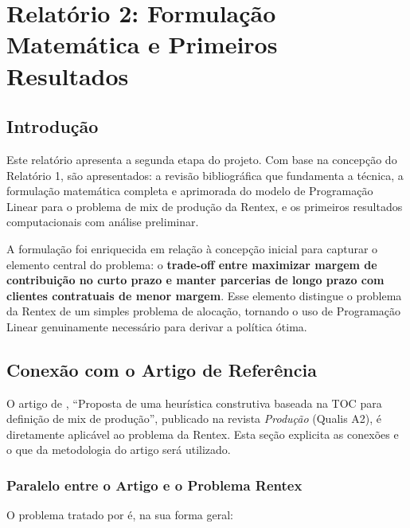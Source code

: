 
\section{Relatório 2: Formulação Matemática e Primeiros Resultados}

\subsection{Introdução}

Este relatório apresenta a segunda etapa do projeto. Com base na concepção
do Relatório 1, são apresentados: a revisão bibliográfica que fundamenta a
técnica, a formulação matemática completa e aprimorada do modelo de
Programação Linear para o problema de mix de produção da Rentex, e os
primeiros resultados computacionais com análise preliminar.

A formulação foi enriquecida em relação à concepção inicial para capturar o
elemento central do problema: o \textbf{trade-off entre maximizar margem de
contribuição no curto prazo e manter parcerias de longo prazo com clientes
contratuais de menor margem}. Esse elemento distingue o problema da Rentex de
um simples problema de alocação, tornando o uso de Programação Linear
genuinamente necessário para derivar a política ótima.

\newpage

\subsection{Conexão com o Artigo de Referência}

O artigo de \textcite{sobreiro2013}, ``Proposta de uma heurística construtiva
baseada na TOC para definição de mix de produção'', publicado na revista
\textit{Produção} (Qualis A2), é diretamente aplicável ao problema da Rentex.
Esta seção explicita as conexões e o que da metodologia do artigo será utilizado.

\subsubsection{Paralelo entre o Artigo e o Problema Rentex}

O problema tratado por \textcite{sobreiro2013} é, na sua forma geral:

